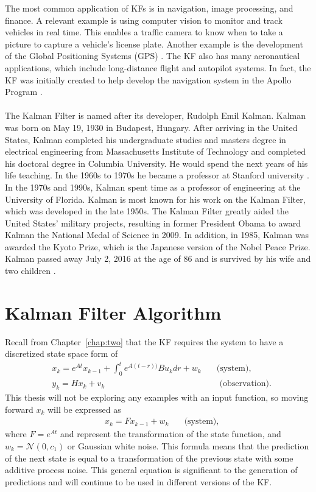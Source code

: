 \newpage

\noindent The most common application of KFs is in navigation, image processing, and finance. A relevant example is using computer vision to monitor and track vehicles in real time. This enables a traffic camera to know when to take a picture to capture a vehicle's license plate. Another example is the development of the Global Positioning Systems (GPS) \cite{lim_ong_lim_koo_2016}. The KF also has many aeronautical applications, which include long-distance flight and autopilot systems. In fact, the KF was initially created to help develop the navigation system in the Apollo Program \cite{kalmanbio}.  \\ \\


\noindent The Kalman Filter is named after its developer, Rudolph Emil Kalman. Kalman was born on May 19, 1930 in Budapest, Hungary. After arriving in the United States, Kalman completed his undergraduate studies and masters degree in electrical engineering from Massachusetts Institute of Technology and completed his doctoral degree in Columbia University. He would spend the next years of his life teaching. In the 1960s to 1970s he became a professor at Stanford university \cite{kalmanbio}. In the 1970s and 1990s, Kalman spent time as a professor of engineering at the University of Florida. Kalman is most known for his work on the Kalman Filter, which was developed in the late 1950s. The Kalman Filter greatly aided the United States' military projects, resulting in former President Obama to award Kalman the National Medal of Science in 2009. In addition, in 1985, Kalman was awarded the Kyoto Prize, which is the Japanese version of the Nobel Peace Prize. Kalman passed away July 2, 2016 at the age of 86 and is survived by his wife and two children \cite{Kalman_bio}. 

\newpage

\section{Kalman Filter Algorithm}

\noindent Recall from Chapter~\ref{chap:two} that the KF requires the system to have a discretized state space form of \begin{align*}
& x_k= e^{At}x_{k-1} + \int_0^t e^{A(t-r))} B u_k dr + w_k \quad &\text{(system)}, \\
&y_k = H x_k + v_k  &\text{   (observation)}.
\end{align*}
 This thesis will not be exploring any examples with an input function, so moving forward $x_k$ will be expressed as 
\begin{align*}
& x_k= Fx_{k-1} + w_k \quad &\text{(system)},
\end{align*}
where $F=e^{At}$ and represent the transformation of the state function, and $w_k = \mathcal{N}(0, c_1)$ or Gaussian white noise. This formula means that the prediction of the next state is equal to a transformation of the previous state with some additive process noise. This general equation is significant to the generation of predictions and will continue to be used in different versions of the KF. \\ 

